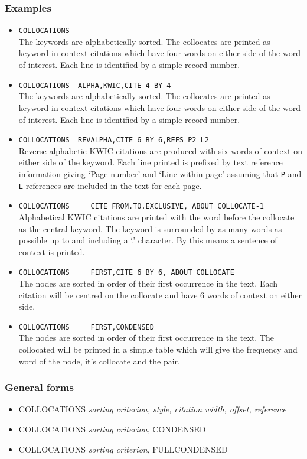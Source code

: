 \subsubsection{Examples}
\begin{itemize}
\item   \verb/COLLOCATIONS/\\
    The keywords are alphabetically sorted.
    The collocates are printed as keyword in context citations which
    have four words on either side of the word of interest.  Each line is
    identified by a simple record number.
\item   \verb/COLLOCATIONS  ALPHA,KWIC,CITE 4 BY 4/\\
    The keywords are alphabetically sorted.
    The collocates are printed as keyword in context citations which
    have four words on either side of the word of interest.  Each line is
    identified by a simple record number.
\item   \verb/COLLOCATIONS  REVALPHA,CITE 6 BY 6,REFS P2 L2/\\
    Reverse alphabetic KWIC citations are produced with six words
    of context on either side of the keyword.  Each line printed is
    prefixed by text reference information giving `Page number' and `Line
    within page' assuming that \verb/P/ and \verb/L/ references are included
    in the text for each page.
\item   \verb/COLLOCATIONS     CITE FROM.TO.EXCLUSIVE, ABOUT COLLOCATE-1/\\
    Alphabetical KWIC citations are printed with the word before the
    collocate as the central keyword.  The keyword is
    surrounded by as many words as possible up to and including a `.'
    character.  By this means a sentence of context is printed.
\item  \verb/COLLOCATIONS     FIRST,CITE 6 BY 6, ABOUT COLLOCATE/\\
    The nodes are sorted in order of their first occurrence in the text.
    Each citation will be centred on the collocate and have 6 words of context
    on either side.
\item   \verb/COLLOCATIONS     FIRST,CONDENSED/\\
    The nodes are sorted in order of their first occurrence in the text.
    The collocated will be printed in a simple table which will give the
    frequency and word of the node, it's collocate and the pair.
\end{itemize}

\subsubsection{General forms}
\begin{itemize}
\item 
COLLOCATIONS {\em sorting criterion, style, citation width, offset, reference}
\item COLLOCATIONS {\em sorting criterion}, CONDENSED
\item COLLOCATIONS {\em sorting criterion}, FULLCONDENSED
\end{itemize}

